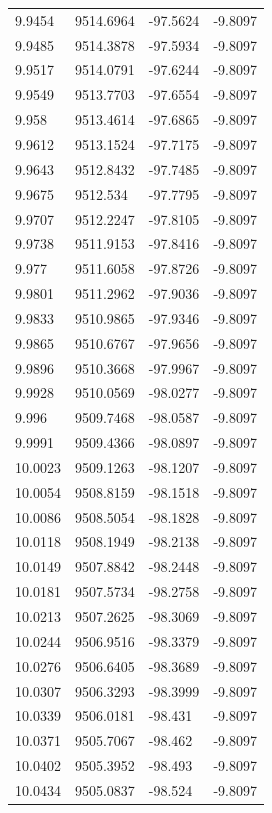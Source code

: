 \begin{table}[H]
\begin{tabular}{llll}
9.9454 & 9514.6964 & -97.5624 & -9.8097 \\
9.9485 & 9514.3878 & -97.5934 & -9.8097 \\
9.9517 & 9514.0791 & -97.6244 & -9.8097 \\
9.9549 & 9513.7703 & -97.6554 & -9.8097 \\
9.958 & 9513.4614 & -97.6865 & -9.8097 \\
9.9612 & 9513.1524 & -97.7175 & -9.8097 \\
9.9643 & 9512.8432 & -97.7485 & -9.8097 \\
9.9675 & 9512.534 & -97.7795 & -9.8097 \\
9.9707 & 9512.2247 & -97.8105 & -9.8097 \\
9.9738 & 9511.9153 & -97.8416 & -9.8097 \\
9.977 & 9511.6058 & -97.8726 & -9.8097 \\
9.9801 & 9511.2962 & -97.9036 & -9.8097 \\
9.9833 & 9510.9865 & -97.9346 & -9.8097 \\
9.9865 & 9510.6767 & -97.9656 & -9.8097 \\
9.9896 & 9510.3668 & -97.9967 & -9.8097 \\
9.9928 & 9510.0569 & -98.0277 & -9.8097 \\
9.996 & 9509.7468 & -98.0587 & -9.8097 \\
9.9991 & 9509.4366 & -98.0897 & -9.8097 \\
10.0023 & 9509.1263 & -98.1207 & -9.8097 \\
10.0054 & 9508.8159 & -98.1518 & -9.8097 \\
10.0086 & 9508.5054 & -98.1828 & -9.8097 \\
10.0118 & 9508.1949 & -98.2138 & -9.8097 \\
10.0149 & 9507.8842 & -98.2448 & -9.8097 \\
10.0181 & 9507.5734 & -98.2758 & -9.8097 \\
10.0213 & 9507.2625 & -98.3069 & -9.8097 \\
10.0244 & 9506.9516 & -98.3379 & -9.8097 \\
10.0276 & 9506.6405 & -98.3689 & -9.8097 \\
10.0307 & 9506.3293 & -98.3999 & -9.8097 \\
10.0339 & 9506.0181 & -98.431 & -9.8097 \\
10.0371 & 9505.7067 & -98.462 & -9.8097 \\
10.0402 & 9505.3952 & -98.493 & -9.8097 \\
10.0434 & 9505.0837 & -98.524 & -9.8097 \\

\end{tabular}
\end{table}
